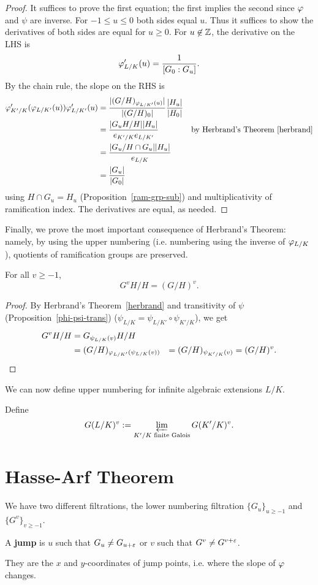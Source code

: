 \begin{proof}
It suffices to prove the first equation; the first implies the second since $\varphi$ and $\psi$ are inverse. For $-1\le u\le 0$ both sides equal $u$. Thus it suffices to show the derivatives of both sides are equal for $u\ge 0$. For $u\not\in \mathbb{Z}$, the derivative on the LHS is
\[
\varphi'_{L/K}(u)=\frac{1}{[G_0:G_u]}.
\]
By the chain rule, the slope on the RHS is
\begin{align*}
\varphi'_{K'/K}(\varphi_{L/K'}(u))\varphi'_{L/K'}(u)&=\frac{|(G/H)_{\varphi_{L/K'}(u)}|}{|(G/H)_0|}\frac{|H_u|}{|H_0|}\\
&=\frac{|G_uH/H||H_u|}{e_{K'/K}e_{L/K'}}&\text{by Herbrand's Theorem~\ref{herbrand}}\\
&=\frac{|G_u/H\cap G_u||H_u|}{e_{L/K}}\\
&=\frac{|G_u|}{|G_0|}
\end{align*}
using $H\cap G_u=H_u$ (Proposition~\ref{ram-grp-sub}) and multiplicativity of ramification index. The derivatives are equal, as needed.
\end{proof}
Finally, we prove the most important consequence of Herbrand's Theorem: namely, by using the upper numbering (i.e. numbering using the inverse of $\varphi_{L/K}$), quotients of ramification groups are preserved.
\begin{pr}
For all $v\ge -1$,
\[
G^vH/H=(G/H)^v.
\]
\end{pr}
\begin{proof}
By Herbrand's Theorem~\ref{herbrand} and transitivity of $\psi$ (Proposition~\ref{phi-psi-trans}) ($\psi_{L/K}=\psi_{L/K'}\circ \psi_{K'/K}$), we get
\begin{align*}
G^vH/H&=G_{\psi_{L/K}(v)}H/H\\
&=(G/H)_{\ph_{L/K'}(\psi_{L/K}(v))}%
&=(G/H)_{\psi_{K'/K}(v)}=(G/H)^v.
\qedhere
\end{align*}
\end{proof}
We can now define upper numbering for infinite algebraic extensions $L/K$.
\begin{df}
Define
\[
G(L/K)^v:=\varprojlim_{K'/K\text{ finite Galois}} G(K'/K)^v.
\]
\end{df}
\section{Hasse-Arf Theorem}
We have two different filtrations, the lower numbering filtration $\{G_u\}_{u\ge -1}$ and $\{G^v\}_{v\ge -1}$.
\begin{df}
A \textbf{jump} is $u$ such that $G_u\ne G_{u+\varepsilon}$ or $v$ such that $G^v\ne G^{v+\varepsilon}$.
\end{df}
They are the $x$ and $y$-coordinates of jump points, i.e. where the slope of $\varphi$ changes.

